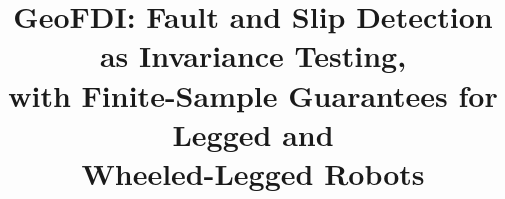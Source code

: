 \documentclass[conference]{IEEEtran}
\theoremstyle{definition}
\theoremstyle{remark}
\begin{document}
\title{GeoFDI: Fault and Slip Detection as Invariance Testing,\\
with Finite-Sample Guarantees for Legged and\\ Wheeled-Legged Robots}

\author{
\and
{}
}

\maketitle

\begin{abstract}

\end{abstract}















\appendices

\end{document}
